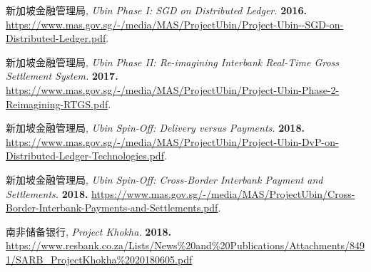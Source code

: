 \begin{thebibliography}{99}
     新加坡金融管理局,
    \newblock \textit{Ubin Phase I: SGD on Distributed Ledger.}
    \newblock \textbf{2016.}
    \newblock \url{https://www.mas.gov.sg/-/media/MAS/ProjectUbin/Project-Ubin--SGD-on-Distributed-Ledger.pdf}.

     新加坡金融管理局,
    \newblock \textit{Ubin Phase II: Re-imagining Interbank Real-Time Gross Settlement System.}
    \newblock \textbf{2017.}
    \newblock \url{https://www.mas.gov.sg/-/media/MAS/ProjectUbin/Project-Ubin-Phase-2-Reimagining-RTGS.pdf}.

     新加坡金融管理局,
    \newblock \textit{Ubin Spin-Off: Delivery versus Payments.}
    \newblock \textbf{2018.}
    \newblock \url{https://www.mas.gov.sg/-/media/MAS/ProjectUbin/Project-Ubin-DvP-on-Distributed-Ledger-Technologies.pdf}.

     新加坡金融管理局,
    \newblock \textit{Ubin Spin-Off: Cross-Border Interbank Payment and Settlements.}
    \newblock \textbf{2018.}
    \newblock \url{https://www.mas.gov.sg/-/media/MAS/ProjectUbin/Cross-Border-Interbank-Payments-and-Settlements.pdf}.

     南非储备银行,
    \newblock \textit{Project Khokha.}
    \newblock \textbf{2018.}
    \newblock \url{https://www.resbank.co.za/Lists/News\%20and\%20Publications/Attachments/8491/SARB\_ProjectKhokha\%2020180605.pdf}

\end{thebibliography}
